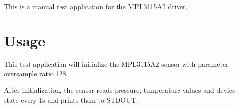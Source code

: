This is a manual test application for the M\+P\+L3115\+A2 driver.

\section*{Usage}

This test application will initialize the M\+P\+L3115\+A2 sensor with parameter oversample ratio 128

After initialization, the sensor reads pressure, temperature values and device state every 1s and prints them to S\+T\+D\+O\+UT. 